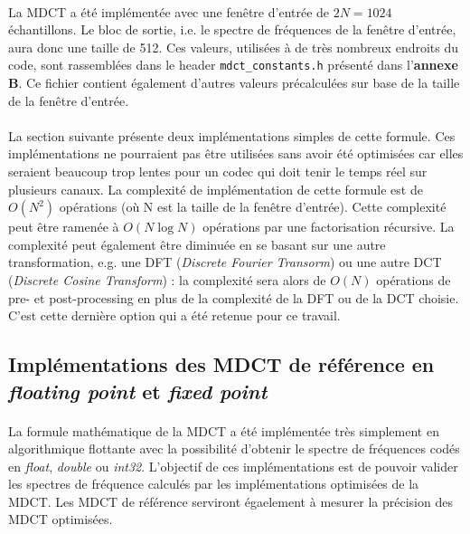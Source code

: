 \documentclass{article}
\begin{document}
    \paragraph{}
    La MDCT a été implémentée avec une fenêtre d'entrée de $2N = 1024$ échantillons. Le bloc de sortie, i.e. le spectre de fréquences de la fenêtre d'entrée, aura donc une taille de 512. Ces valeurs, utilisées à de très nombreux endroits du code, sont rassemblées dans le header \texttt{mdct\_constants.h} présenté dans l'\textbf{annexe B}. Ce fichier contient également d'autres valeurs précalculées sur base de la taille de la fenêtre d'entrée.

    \paragraph{}
    La section suivante présente deux implémentations simples de cette formule. Ces implémentations ne pourraient pas être utilisées sans avoir été optimisées car elles seraient beaucoup trop lentes pour un codec qui doit tenir le temps réel sur plusieurs canaux. La complexité de implémentation de cette formule est de $O(N^2)$ opérations (où N est la taille de la fenêtre d'entrée). Cette complexité peut être ramenée à $O(N \log N)$ opérations par une factorisation récursive. La complexité peut également être diminuée en se basant sur une autre transformation, e.g. une DFT (\emph{Discrete Fourier Transorm}) ou une autre DCT (\emph{Discrete Cosine Transform}) : la complexité sera alors de $O(N)$ opérations de pre- et post-processing en plus de la complexité de la DFT ou de la DCT choisie\cite{wiki:MDCT}. C'est cette dernière option qui a été retenue pour ce travail.

    \subsection{Implémentations des MDCT de référence en \emph{floating point} et \emph{fixed point}}

    \paragraph{}
    La formule mathématique de la MDCT a été implémentée très simplement en algorithmique flottante avec la possibilité d'obtenir le spectre de fréquences codés en \emph{float}, \emph{double} ou \emph{int32}. L'objectif de ces implémentations est de pouvoir valider les spectres de fréquence calculés par les implémentations optimisées de la MDCT. Les MDCT de référence serviront égaelement à mesurer la précision des MDCT optimisées.
\end{document}
